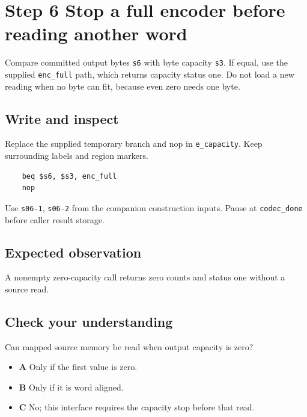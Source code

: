 \section{Step 6 Stop a full encoder before reading another word}\label{delta-s06}

Compare committed output bytes \texttt{s6} with byte capacity \texttt{s3}. If equal, use the supplied \texttt{enc\_full} path, which returns capacity status one. Do not load a new reading when no byte can fit, because even zero needs one byte.

\subsection{Write and inspect}
Replace the supplied temporary branch and nop in \texttt{e\_capacity}. Keep surrounding labels and region markers.

\begin{verbatim}
    beq $s6, $s3, enc_full
    nop
\end{verbatim}
Use \texttt{s06-1}, \texttt{s06-2} from the companion construction inputs. Pause at \texttt{codec\_done} before caller result storage.

\subsection{Expected observation}
A nonempty zero-capacity call returns zero counts and status one without a source read.

\subsection{Check your understanding}
Can mapped source memory be read when output capacity is zero?

\begin{itemize}
\item \textbf{A} Only if the first value is zero.
\item \textbf{B} Only if it is word aligned.
\item \textbf{C} No; this interface requires the capacity stop before that read.
\end{itemize}
